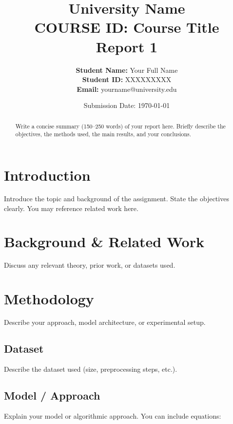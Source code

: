 \documentclass[12pt, a4paper]{article}
\title{
  \vspace{-1cm}
  {\large University Name} \\[0.3cm]
  {\LARGE \textbf{COURSE ID: Course Title}} \\[0.4cm]
  {\Large Report 1} \\[3cm]
  
}
\author{
  \textbf{Student Name:} Your Full Name \\
  \textbf{Student ID:}   XXXXXXXXX \\
  \textbf{Email:}        yourname@university.edu
}
\date{Submission Date: \today}
\begin{document}
\maketitle
\thispagestyle{empty}
\newpage

\begin{abstract}
Write a concise summary (150–250 words) of your report here.
Briefly describe the objectives, the methods used, the main
results, and your conclusions.
\end{abstract}

\newpage
\tableofcontents
\newpage

\section{Introduction}
\label{sec:intro}

Introduce the topic and background of the assignment. State the
objectives clearly. You may reference related work
\cite{example2020} here.

\section{Background \& Related Work}
\label{sec:background}

Discuss any relevant theory, prior work, or datasets used.

\section{Methodology}
\label{sec:method}

Describe your approach, model architecture, or experimental
setup.

\subsection{Dataset}

Describe the dataset used (size, preprocessing steps, etc.).

\subsection{Model / Approach}

Explain your model or algorithmic approach. You can include
equations:
\end{document}
